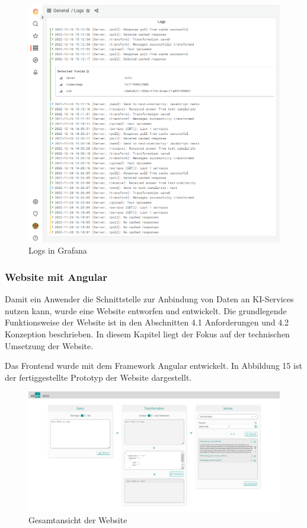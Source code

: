 \begin{figure}[H]
  \centering
    \includegraphics[width = 15cm]{bilder/grafana}
    \caption{Logs in Grafana}
\end{figure}

\subsubsection{Website mit Angular}
Damit ein Anwender die Schnittstelle zur Anbindung von Daten an KI-Services nutzen kann, wurde eine Website entworfen und entwickelt. Die grundlegende Funktionsweise der Website ist in den Abschnitten 4.1 Anforderungen und 4.2 Konzeption beschrieben. In diesem Kapitel liegt der Fokus auf der technischen Umsetzung der Website. 

Das Frontend wurde mit dem Framework Angular entwickelt. In Abbildung 15 ist der fertiggestellte Prototyp der Website dargestellt. 

\begin{figure}[H]
  \centering
    \includegraphics[width = 15cm]{bilder/website}
    \caption{Gesamtansicht der Website}
\end{figure}

